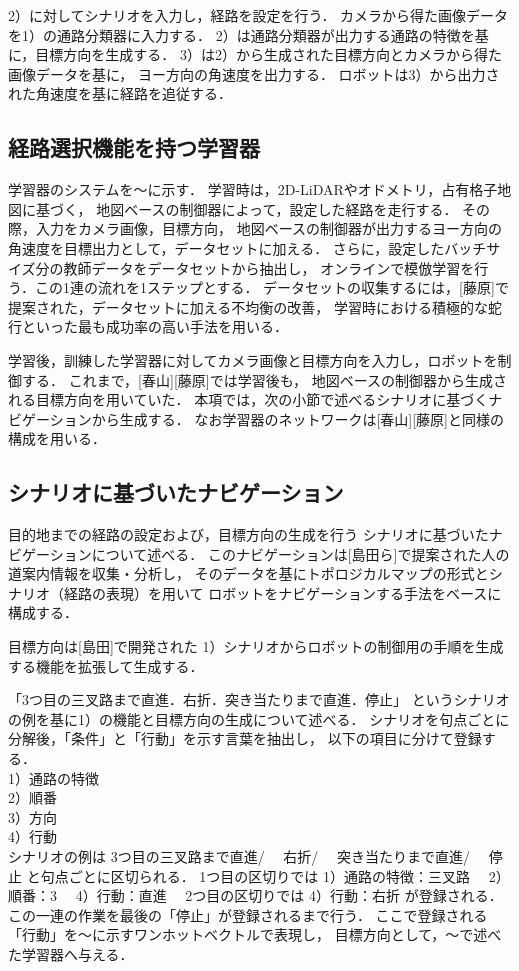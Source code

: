 \documentclass{sice-si}
\begin{document}
2）に対してシナリオを入力し，経路を設定を行う．
カメラから得た画像データを1）の通路分類器に入力する．
2）は通路分類器が出力する通路の特徴を基に，目標方向を生成する．
3）は2）から生成された目標方向とカメラから得た画像データを基に，
ヨー方向の角速度を出力する．
ロボットは3）から出力された角速度を基に経路を追従する．


\subsection{経路選択機能を持つ学習器}
学習器のシステムを〜に示す．
学習時は，2D-LiDARやオドメトリ，占有格子地図に基づく，
地図ベースの制御器によって，設定した経路を走行する．
その際，入力をカメラ画像，目標方向，
地図ベースの制御器が出力するヨー方向の角速度を目標出力として，データセットに加える．
さらに，設定したバッチサイズ分の教師データをデータセットから抽出し，
オンラインで模倣学習を行う．この1連の流れを1ステップとする．
データセットの収集するには，[藤原]で提案された，データセットに加える不均衡の改善，
学習時における積極的な蛇行といった最も成功率の高い手法を用いる．\par
学習後，訓練した学習器に対してカメラ画像と目標方向を入力し，ロボットを制御する．
これまで，[春山][藤原]では学習後も，
地図ベースの制御器から生成される目標方向を用いていた．
本項では，次の小節で述べるシナリオに基づくナビゲーションから生成する．
なお学習器のネットワークは[春山][藤原]と同様の構成を用いる．

\subsection{シナリオに基づいたナビゲーション}
目的地までの経路の設定および，目標方向の生成を行う
シナリオに基づいたナビゲーションについて述べる．
このナビゲーションは[島田ら]で提案された人の道案内情報を収集・分析し，
そのデータを基にトポロジカルマップの形式とシナリオ（経路の表現）を用いて
ロボットをナビゲーションする手法をベースに構成する．

目標方向は[島田]で開発された
1）シナリオからロボットの制御用の手順を生成する機能を拡張して生成する．
\par
「3つ目の三叉路まで直進．右折．突き当たりまで直進．停止」
というシナリオの例を基に1）の機能と目標方向の生成について述べる．
シナリオを句点ごとに分解後，「条件」と「行動」を示す言葉を抽出し，
以下の項目に分けて登録する．\\
1）通路の特徴\\
2）順番\\
3）方向\\
4）行動\\
シナリオの例は
3つ目の三叉路まで直進/　
右折/　
突き当たりまで直進/　
停止
と句点ごとに区切られる．
1つ目の区切りでは
1）通路の特徴：三叉路　
2）順番：3　
4）行動：直進　
2つ目の区切りでは
4）行動：右折
が登録される．
この一連の作業を最後の「停止」が登録されるまで行う．
ここで登録される「行動」を〜に示すワンホットベクトルで表現し，
目標方向として，〜で述べた学習器へ与える．
\end{document}
